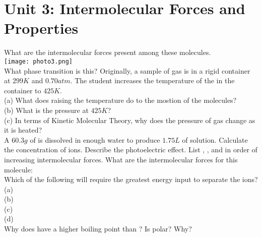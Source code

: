 \documentclass[../main.tex]{subfiles}
\begin{document}
\section{Unit 3: Intermolecular Forces and Properties}
\ProblemSet
What are the intermolecular forces present among these molecules. \\ 
\ProblemSet
\texttt{[image: photo3.png]} \\
What phase transition is this?
\ProblemSet
Originally, a sample of gas is in a rigid container at \(299K\) and \(0.70 atm\). The student increases the temperature of the  in the container to \(425K\).\\
(a) What does raising the temperature do to the mostion of the molecules?\\
(b) What is the pressure at \(425K\)?\\
(c) In terms of Kinetic Molecular Theory, why does the pressure of gas change as it is heated? \\
\ProblemSet
A \(60.3g\) of  is dissolved in enough water to produce \(1.75L\) of solution. Calculate the concentration of  ions. 
\ProblemSet
Describe the photoelectric effect. 
\ProblemSet
List , , and  in order of increasing intermolecular forces. 
\ProblemSet
What are the intermolecular forces for this molecule:\\
\ProblemSet
Which of the following will require the greatest energy input to separate the ions?\\
(a) \\
(b) \\
(c) \\
(d) \\
\ProblemSet
Why does  have a higher boiling point than ?
\ProblemSet
Is  polar? Why?
\end{document}
